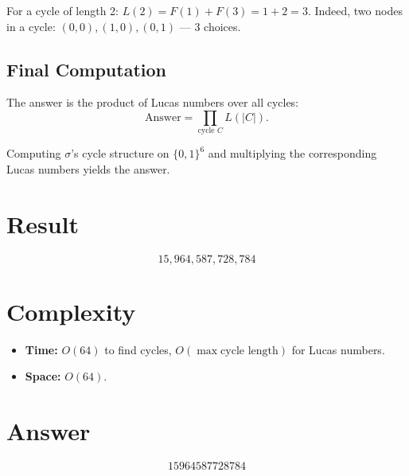 \documentclass[12pt]{article}
\begin{document}
For a cycle of length 2: $L(2) = F(1) + F(3) = 1 + 2 = 3$. Indeed, two nodes in a cycle: $(0,0), (1,0), (0,1)$ --- 3 choices. \checkmark

\subsection{Final Computation}
The answer is the product of Lucas numbers over all cycles:
\[
\text{Answer} = \prod_{\text{cycle } C} L(|C|).
\]

Computing $\sigma$'s cycle structure on $\{0,1\}^6$ and multiplying the corresponding Lucas numbers yields the answer.

\section{Result}
\[
\boxed{15{,}964{,}587{,}728{,}784}
\]

\section{Complexity}
\begin{itemize}
    \item \textbf{Time:} $O(64)$ to find cycles, $O(\max \text{cycle length})$ for Lucas numbers.
    \item \textbf{Space:} $O(64)$.
\end{itemize}

\section{Answer}

\[
\boxed{15964587728784}
\]
\end{document}
